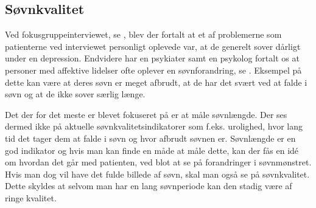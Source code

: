 \subsection{Søvnkvalitet}
Ved fokusgruppeinterviewet, se \citep[Sektion 1.5]{misc:faellesrapp}, blev der fortalt at et af problemerne som patienterne ved interviewet personligt oplevede var, at de generelt sover dårligt under en depression.
Endvidere har en psykiater samt en psykolog fortalt os at personer med affektive lidelser ofte oplever en søvnforandring, se \citep[Sektion 1.3--1.4]{misc:faellesrapp}.
Eksempel på dette kan være at deres søvn er meget afbrudt, at de har det svært ved at falde i søvn og at de ikke sover særlig længe.

Det der for det meste er blevet fokuseret på er at måle søvnlængde. 
Der ses dermed ikke på aktuelle søvnkvalitetsindikatorer som f.eks. urolighed, hvor lang tid det tager dem at falde i søvn og hvor afbrudt søvnen er.
Søvnlængde er en god indikator og hvis man kan finde en måde at måle dette, kan der fås en idé om hvordan det går med patienten, ved blot at se på forandringer i søvnmønstret. 
Hvis man dog vil have det fulde billede af søvn, skal man også se på søvnkvalitet. 
Dette skyldes at selvom man har en lang søvnperiode kan den stadig være af ringe kvalitet.